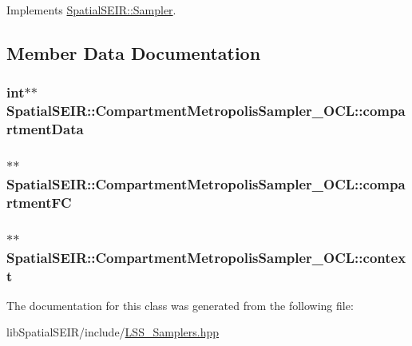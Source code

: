 Implements \hyperlink{classSpatialSEIR_1_1Sampler_aaa79310ad809e6aeb25479849f322dda}{Spatial\-S\-E\-I\-R\-::\-Sampler}.



\subsection{Member Data Documentation}
\hypertarget{classSpatialSEIR_1_1CompartmentMetropolisSampler__OCL_a4bcbbab42aac73ed628addf8d7a93526}{
\subsubsection[{compartment\-Data}]{\setlength{\rightskip}{0pt plus 5cm}int$\ast$$\ast$ Spatial\-S\-E\-I\-R\-::\-Compartment\-Metropolis\-Sampler\-\_\-\-O\-C\-L\-::compartment\-Data}}\label{classSpatialSEIR_1_1CompartmentMetropolisSampler__OCL_a4bcbbab42aac73ed628addf8d7a93526}
\hypertarget{classSpatialSEIR_1_1CompartmentMetropolisSampler__OCL_a794de19e975d79673a8c7b9c952ce075}{
\subsubsection[{compartment\-F\-C}]{$\ast$$\ast$ Spatial\-S\-E\-I\-R\-::\-Compartment\-Metropolis\-Sampler\-\_\-\-O\-C\-L\-::compartment\-F\-C}}\label{classSpatialSEIR_1_1CompartmentMetropolisSampler__OCL_a794de19e975d79673a8c7b9c952ce075}
\hypertarget{classSpatialSEIR_1_1CompartmentMetropolisSampler__OCL_a231d67f96a0b9e2834b600804f1b06a1}{
\subsubsection[{context}]{$\ast$$\ast$ Spatial\-S\-E\-I\-R\-::\-Compartment\-Metropolis\-Sampler\-\_\-\-O\-C\-L\-::context}}\label{classSpatialSEIR_1_1CompartmentMetropolisSampler__OCL_a231d67f96a0b9e2834b600804f1b06a1}


The documentation for this class was generated from the following file\-:\begin{DoxyCompactItemize}
\item 
lib\-Spatial\-S\-E\-I\-R/include/\hyperlink{LSS__Samplers_8hpp}{L\-S\-S\-\_\-\-Samplers.\-hpp}\end{DoxyCompactItemize}
